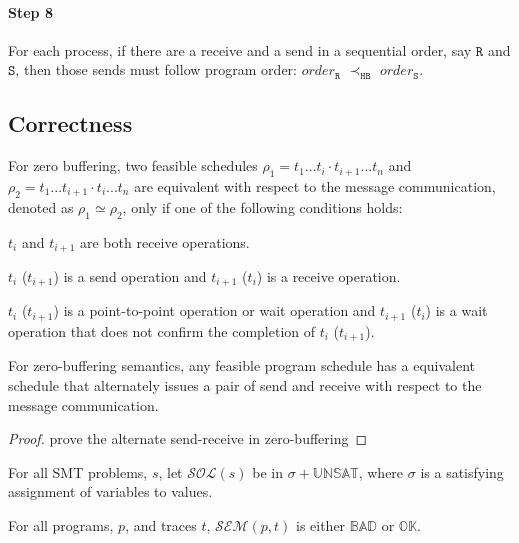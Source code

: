 \paragraph*{Step 8} For each process, if there are a receive and a send in a sequential order, say $\mathtt{R}$ and $\mathtt{S}$, then those
sends must follow program order: $\mathit{order}_\mathtt{R}$
$\prec_\mathtt{HB}$ $\mathit{order}_\mathtt{S}$. 

\subsection{Correctness}

\begin{definition}
For zero buffering, two feasible schedules $\rho_1 = t_1...t_i\cdot t_{i+1}...t_n$ and $\rho_2 = t_1...t_{i+1}\cdot t_i...t_n$ are equivalent with respect to the message communication, denoted as $\rho_1 \simeq \rho_2$, only if one of the following conditions holds:
\begin{compactenum} 
\item $t_i$ and $t_{i+1}$ are both receive operations.
\item $t_i$ ($t_{i+1}$) is a send operation and $t_{i+1}$ ($t_i$) is a receive operation.
\item $t_i$ ($t_{i+1}$) is a point-to-point operation or wait operation and $t_{i+1}$ ($t_i$) is a wait operation that does not confirm the completion of $t_i$ ($t_{i+1}$).
\end{compactenum}
\end{definition}

\begin{lemma}
For zero-buffering semantics, any feasible program schedule has a equivalent schedule that alternately issues a pair of send and receive with respect to the message communication. 
\end{lemma}

\begin{proof}
prove the alternate send-receive in zero-buffering
\end{proof}

\begin{definition}
For all SMT problems, $s$, let $\mathcal{SOL}(s)$ be in $\sigma +
\mathbb{UNSAT}$, where $\sigma$ is a satisfying assignment of
variables to values.
\end{definition}

\begin{definition}[Semantics]
For all programs, $p$, and traces $t$, $\mathcal{SEM}(p, t)$ is either
$\mathbb{BAD}$ or $\mathbb{OK}$.
\end{definition}

